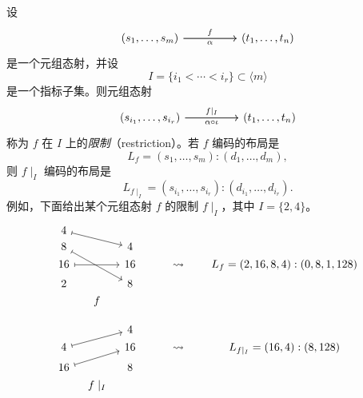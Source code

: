 \begin{example}[限制]\label{definitionofrestriction}
设
\[\begin{tikzcd} (s_1,\dots,s_m) \ar[rr,"f"] \ar[rr,swap,"\alpha"] & &  (t_1,\dots,t_n)
    \end{tikzcd} \]
是一个元组态射，并设
\[I = \{i_1 < \cdots < i_r \} \subset \langle m \rangle\]
是一个指标子集。则元组态射
\[\begin{tikzcd} (s_{i_1},\dots,s_{i_r}) \ar[rr,"f\mid_I"] \ar[rr,swap,"\alpha \circ \iota"] & &  (t_1,\dots,t_n)
    \end{tikzcd} \]
称为 $f$ 在 $I$ 上的{\it 限制}（restriction）。若 $f$ 编码的布局是
 \[L_f = (s_1,\dots,s_m):(d_1,\dots,d_m),\]
 则 $f \mid_I$ 编码的布局是
\[L_{f \mid_I} = (s_{i_1},\dots,s_{i_r}):(d_{i_1},\dots,d_{i_r}).\]
例如，下面给出某个元组态射 $f$ 的限制 $f \mid_I$，其中 $I = \{2,4\}$。
    \[ \begin{tikzcd} [row sep = 1, column sep = 8]
    4 \ar[rrd,mapsto] & & & & & & \\
    8 \ar[ddrr,mapsto] & & 4 & & & & \\
    16 \ar[rr,mapsto] & & 16 & & \rightsquigarrow & & L_f = (2,16,8,4):(0,8,1,128)\\
    2 & & 8 & & & & \\
    & f & & & & & \\
    & & & \vspace{5.0in} & & & \\
    & & & & & &  \\
    & & 4 & & & & \\
    4 \ar[rru,mapsto] & & 16 & & \rightsquigarrow & & L_{f\mid_I} = (16,4):(8,128)\\
    16 \ar[urr,mapsto] & & 8 & &  & & \\
    & f\mid_{I} & & & & & \\
    \end{tikzcd} \]
\end{example}

